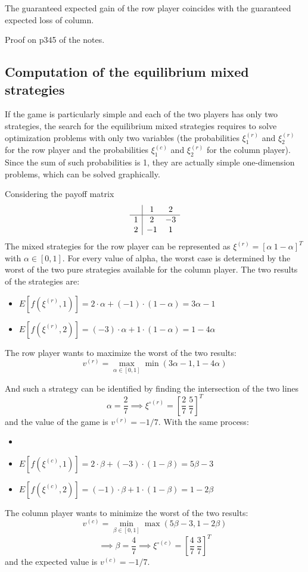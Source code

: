 The guaranteed expected gain of the row player coincides with the guaranteed expected loss of column.

Proof on p345 of the notes.

\subsection{Computation of the equilibrium mixed strategies}

If the game is particularly simple and each of the two players has only two strategies, the search for the equilibrium mixed strategies requires to solve optimization problems with only two variables (the probabilities $\xi^{(r)}_1$ and $\xi^{(r)}_2$ for the row player and the probabilities $\xi^{(c)}_1$ and $\xi^{(r)}_2$ for the column player). Since the sum of such probabilities is 1, they are actually simple one-dimension problems, which can be solved graphically.

Considering the payoff matrix
$$ 
\begin{array}{c | c c}
	& 1 & 2 \\
	\hline
	1 & 2 & -3 \\
	2 & -1 & 1 
\end{array}
$$
The mixed strategies for the row player can be represented as $\xi^{(r)} = \left[\alpha \ 1 - \alpha\right]^T$ with $\alpha \in [0,1]$. For every value of alpha, the worst case is determined by the worst of the two pure strategies available for the column player. The two results of the strategies are: 
\begin{itemize}
	\item $E\left[f(\xi^{(r)}, 1)\right] = 2 \cdot \alpha + (-1) \cdot (1 - \alpha) = 3 \alpha - 1$
	
	\item $E\left[f(\xi^{(r)}, 2)\right] = (-3) \cdot \alpha + 1 \cdot (1 - \alpha) = 1 - 4 \alpha$
\end{itemize}

The row player wants to maximize the worst of the two results:
$$ v^{(r)} = \max_{\alpha \in [0,1]} \min (3 \alpha - 1, 1 - 4 \alpha) $$

And such a strategy can be identified by finding the intersection of the two lines
$$ \alpha = \frac{2}{7} \implies \xi^{\circ (r)} = \left[\frac{2}{7} \ \frac{5}{7}\right]^T$$
and the value of the game is $v^{(r)} = -1/7$. With the same process: 
\begin{itemize}
	\item \item $E\left[f(\xi^{(c)}, 1)\right] = 2 \cdot \beta + (-3) \cdot (1 - \beta) = 5 \beta - 3$
	
	\item $E\left[f(\xi^{(c)}, 2)\right] = (-1) \cdot \beta + 1 \cdot (1 - \beta) = 1 - 2 \beta$
\end{itemize}
The column player wants to minimize the worst of the two results:
$$ v^{(c)} = \min_{\beta \in [0,1]} \max (5 \beta - 3, 1 - 2\beta)$$
$$ \implies \beta = \frac{4}{7} \implies \xi^{\circ (c)} = \left[\frac{4}{7} \ \frac{3}{7}\right]^T $$
and the expected value is $v^{(c)} = - 1/7$.

